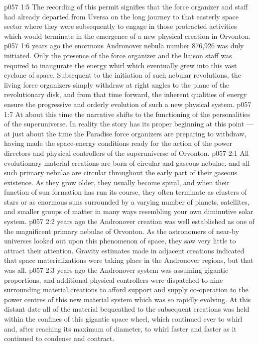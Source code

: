\vs p057 1:5 The recording of this permit signifies that the force organizer and staff had already departed from Uversa on the long journey to that easterly space sector where they were subsequently to engage in those protracted activities which would terminate in the emergence of a new physical creation in Orvonton.
\vs p057 1:6 \pc {} years ago the enormous Andronover nebula number 876,926 was duly initiated. Only the presence of the force organizer and the liaison staff was required to inaugurate the energy whirl which eventually grew into this vast cyclone of space. Subsequent to the initiation of such nebular revolutions, the living force organizers simply withdraw at right angles to the plane of the revolutionary disk, and from that time forward, the inherent qualities of energy ensure the progressive and orderly evolution of such a new physical system.
\vs p057 1:7 At about this time the narrative shifts to the functioning of the personalities of the superuniverse. In reality the story has its proper beginning at this point --- at just about the time the Paradise force organizers are preparing to withdraw, having made the space\hyp{}energy conditions ready for the action of the power directors and physical controllers of the superuniverse of Orvonton.
\vs p057 2:1 All evolutionary material creations are born of circular and gaseous nebulae, and all such primary nebulae are circular throughout the early part of their gaseous existence. As they grow older, they usually become spiral, and when their function of sun formation has run its course, they often terminate as clusters of stars or as enormous suns surrounded by a varying number of planets, satellites, and smaller groups of matter in many ways resembling your own diminutive solar system.
\vs p057 2:2 \pc {} years ago the Andronover creation was well established as one of the magnificent primary nebulae of Orvonton. As the astronomers of near-by universes looked out upon this phenomenon of space, they saw very little to attract their attention. Gravity estimates made in adjacent creations indicated that space materializations were taking place in the Andronover regions, but that was all.
\vs p057 2:3 \pc {} years ago the Andronover system was assuming gigantic proportions, and additional physical controllers were dispatched to nine surrounding material creations to afford support and supply co\hyp{}operation to the power centres of this new material system which was so rapidly evolving. At this distant date all of the material bequeathed to the subsequent creations was held within the confines of this gigantic space wheel, which continued ever to whirl and, after reaching its maximum of diameter, to whirl faster and faster as it continued to condense and contract.
